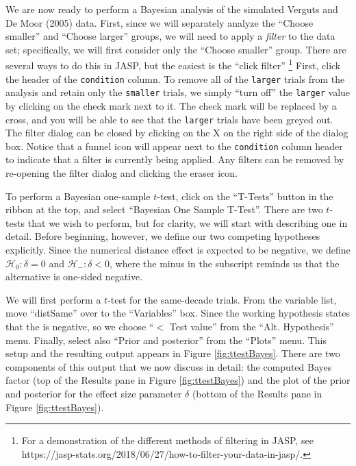 \documentclass[english,,doc,floatsintext]{apa6}
\begin{document}
We are now ready to perform a Bayesian analysis of the simulated Verguts and De Moor (2005) data. First, since we will separately analyze the ``Choose smaller'' and ``Choose larger'' groups, we will need to apply a \emph{filter} to the data set; specifically, we will first consider only the ``Choose smaller'' group. There are several ways to do this in JASP, but the easiest is the ``click filter''
\footnote{For a demonstration of the different methods of filtering in JASP, see https://jasp-stats.org/2018/06/27/how-to-filter-your-data-in-jasp/.}
First, click the header of the \texttt{condition} column. To remove all of the \texttt{larger} trials from the analysis and retain only the \texttt{smaller} trials, we simply ``turn off'' the \texttt{larger} value by clicking on the check mark next to it. The check mark will be replaced by a cross, and you will be able to see that the \texttt{larger} trials have been greyed out. The filter dialog can be closed by clicking on the X on the right side of the dialog box. Notice that a funnel icon will appear next to the \texttt{condition} column header to indicate that a filter is currently being applied. Any filters can be removed by re-opening the filter dialog and clicking the eraser icon.

To perform a Bayesian one-sample \(t\)-test, click on the ``T-Tests'' button in the ribbon at the top, and select ``Bayesian One Sample T-Test''. There are two \(t\)-tests that we wish to perform, but for clarity, we will start with describing one in detail. Before beginning, however, we define our two competing hypotheses explicitly. Since the numerical distance effect is expected to be negative, we define \(\mathcal{H}_{0}:\delta = 0\) and \(\mathcal{H}_{-}:\delta < 0\), where the minus in the subscript reminds us that the alternative is one-sided negative.

We will first perform a \(t\)-test for the same-decade trials. From the variable list, move ``distSame'' over to the ``Variables'' box. Since the working hypothesis states that the is negative, so we choose ``\(<\) Test value'' from the ``Alt. Hypothesis'' menu. Finally, select also ``Prior and posterior'' from the ``Plots'' menu. This setup and the resulting output appears in Figure \ref{fig:ttestBayes}. There are two components of this output that we now discuss in detail: the computed Bayes factor (top of the Results pane in Figure \ref{fig:ttestBayes}) and the plot of the prior and posterior for the effect size parameter \(\delta\) (bottom of the Results pane in Figure \ref{fig:ttestBayes}).
\end{document}
